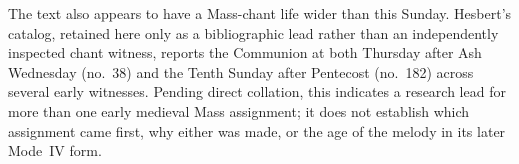 The text also appears to have a Mass-chant life wider than this Sunday.
Hesbert's catalog, retained here only as a bibliographic lead rather than an
independently inspected chant witness, reports the Communion at both Thursday
after Ash Wednesday (no.~38) and the Tenth Sunday after Pentecost (no.~182)
across several early witnesses. Pending direct collation, this indicates a
research lead for more than one early medieval Mass assignment; it does not
establish which assignment came first, why either was made, or the age of the
melody in its later Mode~IV form.
